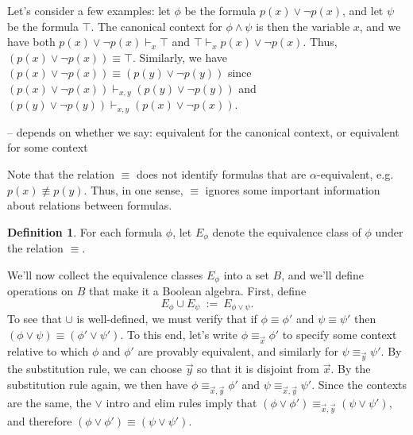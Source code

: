 \documentclass[10pt,fleqn]{article}
\theoremstyle{definition}
\newtheorem*{defn}{Definition}
\theoremstyle{remark}
\newcommand{\2}{\mathscr}
\begin{document}
Let's consider a few examples: let $\phi$ be the formula $p(x)\vee
\neg p(x)$, and let $\psi$ be the formula $\top$.  The canonical
context for $\phi\wedge\psi$ is then the variable $x$, and we have
both $p(x)\vee \neg p(x)\vdash _x\top$ and $\top\vdash _xp(x)\vee \neg
p(x)$.  Thus, $(p(x)\vee \neg p(x))\equiv \top$.  Similarly, we have
$(p(x)\vee \neg p(x))\equiv (p(y)\vee \neg p(y))$ since $(p(x)\vee
\neg p(x))\vdash _{x,y}(p(y)\vee \neg p(y))$ and $(p(y)\vee \neg
p(y))\vdash _{x,y}(p(x)\vee \neg p(x))$.

-- depends on whether we say: equivalent for the canonical context, or
equivalent for some context

Note that the relation $\equiv$ does not identify formulas that are
$\alpha$-equivalent, e.g.\ $p(x)\not\equiv p(y)$.  Thus, in one sense,
$\equiv$ ignores some important information about relations between
formulas.

\begin{defn} For each formula $\phi$, let $E_{\phi}$ denote the
  equivalence class of $\phi$ under the relation $\equiv$. \end{defn}


\newcommand{\lra}{\leftrightarrow}

We'll now collect the equivalence classes $E_\phi$ into a set $B$, and
we'll define operations on $B$ that make it a Boolean algebra.  First,
define 
\[ E_\phi\cup E_\psi \: := \: E_{\phi\vee \psi} .\] To see that $\cup$
is well-defined, we must verify that if $\phi\equiv\phi '$ and
$\psi\equiv\psi '$ then $(\phi\vee \psi )\equiv (\phi '\vee \psi ')$.
To this end, let's write $\phi \equiv _{\vec{x}}\phi '$ to specify
some context relative to which $\phi$ and $\phi '$ are provably
equivalent, and similarly for $\psi \equiv _{\vec{y}}\psi '$.  By the
substitution rule, we can choose $\vec{y}$ so that it is disjoint from
$\vec{x}$.  By the substitution rule again, we then have $\phi \equiv
_{\vec{x},\vec{y}}\phi '$ and $\psi \equiv _{\vec{x},\vec{y}}\psi '$.
Since the contexts are the same, the $\vee$ intro and elim rules imply
that $(\phi \vee \phi ')\equiv _{\vec{x},\vec{y}}(\psi \vee \psi ')$,
and therefore $(\phi\vee \phi ')\equiv (\psi \vee \psi ')$.
\end{document}
